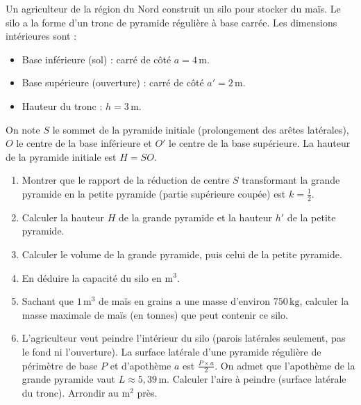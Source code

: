 \documentclass[11pt]{article}
\newcounter{popsec}
\newcounter{popsub}
\newcommand{\courssub}[1]{%
  \stepcounter{popsub}%
  \par\vspace{9pt}\noindent{\popxbold\fontsize{11.5}{13}\selectfont\color{popink}{\color{poporange}\thepopsec.\thepopsub}\hspace{6pt}#1}\par\nopagebreak\vspace{4pt}
}
\begin{document}
\courssub{Je me prépare au BEPC}

\begin{exercice}
\label{exo:silo}
Un agriculteur de la région du Nord construit un silo pour stocker du maïs. Le silo a la forme d'un tronc de pyramide régulière à base carrée.
Les dimensions intérieures sont :
\begin{itemize}
    \item Base inférieure (sol) : carré de côté $a = 4\,\text{m}$.
    \item Base supérieure (ouverture) : carré de côté $a' = 2\,\text{m}$.
    \item Hauteur du tronc : $h = 3\,\text{m}$.
\end{itemize}
On note $S$ le sommet de la pyramide initiale (prolongement des arêtes latérales), $O$ le centre de la base inférieure et $O'$ le centre de la base supérieure. La hauteur de la pyramide initiale est $H = SO$.
\begin{enumerate}
    \item Montrer que le rapport de la réduction de centre $S$ transformant la grande pyramide en la petite pyramide (partie supérieure coupée) est $k = \frac{1}{2}$.
    \item Calculer la hauteur $H$ de la grande pyramide et la hauteur $h'$ de la petite pyramide.
    \item Calculer le volume de la grande pyramide, puis celui de la petite pyramide.
    \item En déduire la capacité du silo en $\text{m}^3$.
    \item Sachant que $1\,\text{m}^3$ de maïs en grains a une masse d'environ $750\,\text{kg}$, calculer la masse maximale de maïs (en tonnes) que peut contenir ce silo.
    \item L'agriculteur veut peindre l'intérieur du silo (parois latérales seulement, pas le fond ni l'ouverture). La surface latérale d'une pyramide régulière de périmètre de base $P$ et d'apothème $a$ est $\frac{P \times a}{2}$.
    On admet que l'apothème de la grande pyramide vaut $L \approx 5,39\,\text{m}$.
    Calculer l'aire à peindre (surface latérale du tronc). Arrondir au $\text{m}^2$ près.
\end{enumerate}
\end{exercice}
\end{document}

